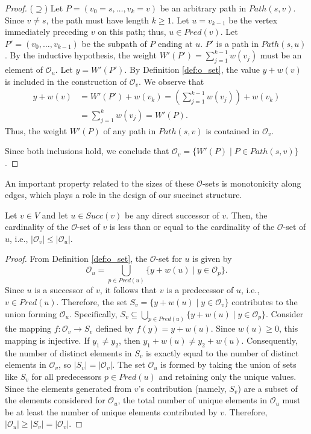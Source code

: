 \begin{proof}
    ($\supseteq$) Let $P = (v_0=s, \dots, v_k=v)$ be an arbitrary path in $Path(s, v)$. Since $v \neq s$, the path must have length $k \ge 1$. Let $u = v_{k-1}$ be the vertex immediately preceding $v$ on this path; thus, $u \in Pred(v)$. Let $P' = (v_0, \dots, v_{k-1})$ be the subpath of $P$ ending at $u$. $P'$ is a path in $Path(s, u)$. By the inductive hypothesis, the weight $W'(P') = \sum_{j=1}^{k-1} w(v_j)$ must be an element of $\mathcal{O}_u$. Let $y = W'(P')$. By Definition \ref{def:o_set}, the value $y + w(v)$ is included in the construction of $\mathcal{O}_v$. We observe that
    \begin{align*}
        y + w(v) & = W'(P') + w(v_k) = \left(\sum_{j=1}^{k-1} w(v_j)\right) + w(v_k) \\
                 & = \sum_{j=1}^{k} w(v_j) = W'(P).
    \end{align*}
    Thus, the weight $W'(P)$ of any path in $Path(s, v)$ is contained in $\mathcal{O}_v$.

    Since both inclusions hold, we conclude that $\mathcal{O}_v = \{ W'(P) \mid P \in Path(s, v) \}$.
\end{proof}

An important property related to the sizes of these $\mathcal{O}$-sets is monotonicity along edges, which plays a role in the design of our succinct structure.

\begin{lemma}
    \label{lem:o_set_cardinality_monotonicity}
    Let $v \in V$ and let $u \in Succ(v)$ be any direct successor of $v$. Then, the cardinality of the $\mathcal{O}$-set of $v$ is less than or equal to the cardinality of the $\mathcal{O}$-set of $u$, i.e., $|\mathcal{O}_v| \le |\mathcal{O}_u|$.
\end{lemma}
\begin{proof}
    From Definition \ref{def:o_set}, the $\mathcal{O}$-set for $u$ is given by
    \[ \mathcal{O}_u = \bigcup_{p \in Pred(u)} \{ y + w(u) \mid y \in \mathcal{O}_p \}. \]
    Since $u$ is a successor of $v$, it follows that $v$ is a predecessor of $u$, i.e., $v \in Pred(u)$. Therefore, the set $S_v = \{ y + w(u) \mid y \in \mathcal{O}_v \}$ contributes to the union forming $\mathcal{O}_u$. Specifically, $S_v \subseteq \bigcup_{p \in Pred(u)} \{ y + w(u) \mid y \in \mathcal{O}_p \}$.
    Consider the mapping $f: \mathcal{O}_v \to S_v$ defined by $f(y) = y + w(u)$. Since $w(u) \ge 0$, this mapping is injective. If $y_1 \neq y_2$, then $y_1 + w(u) \neq y_2 + w(u)$. Consequently, the number of distinct elements in $S_v$ is exactly equal to the number of distinct elements in $\mathcal{O}_v$, so $|S_v| = |\mathcal{O}_v|$.
    The set $\mathcal{O}_u$ is formed by taking the union of sets like $S_v$ for all predecessors $p \in Pred(u)$ and retaining only the unique values. Since the elements generated from $v$'s contribution (namely, $S_v$) are a subset of the elements considered for $\mathcal{O}_u$, the total number of unique elements in $\mathcal{O}_u$ must be at least the number of unique elements contributed by $v$.
    Therefore, $|\mathcal{O}_u| \ge |S_v| = |\mathcal{O}_v|$.
\end{proof}

